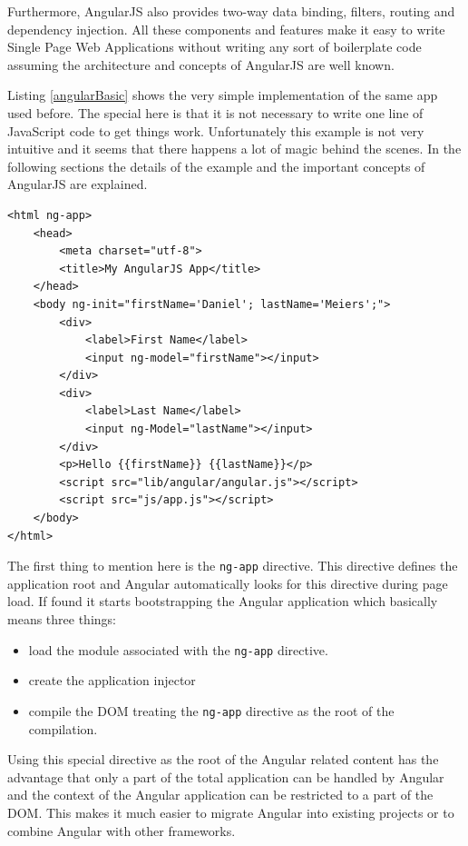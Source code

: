 
Furthermore, AngularJS also provides two-way data binding, filters, routing and dependency injection.
All these components and features make it easy to write Single Page Web Applications without writing any sort of boilerplate code assuming the architecture and concepts of AngularJS are well known.

Listing \ref{angularBasic} shows the very simple implementation of the same app used before.
The special here is that it is not necessary to write one line of JavaScript code to get things work.
Unfortunately this example is not very intuitive and it seems that there happens a lot of magic behind the scenes.
In the following sections the details of the example and the important concepts of AngularJS are explained.

\begin{lstlisting}[label=angularBasic,caption=First Angular application]
<html ng-app>
    <head>
        <meta charset="utf-8">
        <title>My AngularJS App</title>
    </head>
    <body ng-init="firstName='Daniel'; lastName='Meiers';">
        <div>
            <label>First Name</label> 
            <input ng-model="firstName"></input>
        </div>
        <div>
            <label>Last Name</label> 
            <input ng-Model="lastName"></input>
        </div>
        <p>Hello {{firstName}} {{lastName}}</p>
        <script src="lib/angular/angular.js"></script>
        <script src="js/app.js"></script>
    </body>
</html>
\end{lstlisting}

The first thing to mention here is the \texttt{ng-app} directive.
This directive defines the application root and Angular automatically looks for this directive during page load.
If found it starts bootstrapping the Angular application which basically means three things:
\begin{itemize}
	\item load the module associated with the \texttt{ng-app} directive.
	\item create the application injector
	\item compile the DOM treating the \texttt{ng-app} directive as the root of the compilation.
\end{itemize}

Using this special directive as the root of the Angular related content has the advantage that only a part of the total application can be handled by Angular and the context of the Angular application can be restricted to a part of the DOM.
This makes it much easier to migrate Angular into existing projects or to combine Angular with other frameworks.

